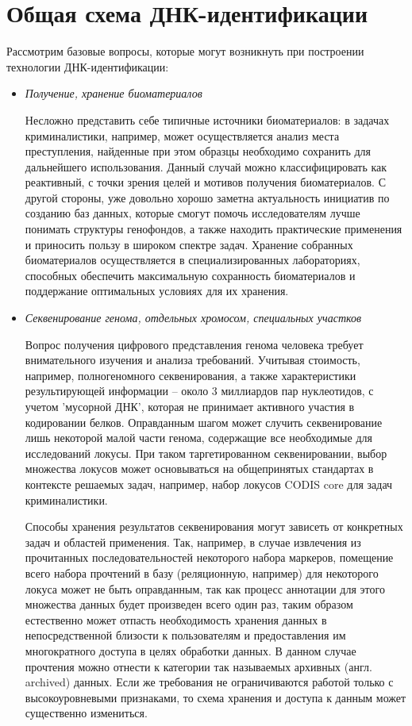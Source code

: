 \section{Общая схема ДНК-идентификации}

Рассмотрим базовые вопросы, которые могут возникнуть при построении технологии ДНК-идентификации:
\begin{itemize}

\item \textit{Получение, хранение биоматериалов}

Несложно представить себе типичные источники биоматериалов: в задачах криминалистики, например,
может осуществляется анализ места преступления, найденные при этом образцы необходимо сохранить
для дальнейшего использования. Данный случай можно классифицировать как реактивный, с точки зрения
целей и мотивов получения биоматериалов. С другой стороны, уже довольно хорошо заметна актуальность инициатив
по созданию баз данных, которые смогут помочь исследователям лучше понимать структуры генофондов,
а также находить практические применения и приносить пользу в широком спектре задач.
Хранение собранных биоматериалов осуществляется в специализированных лабораториях,
способных обеспечить максимальную сохранность биоматериалов и поддержание оптимальных условиях для
их хранения.

\item \textit{Секвенирование генома, отдельных хромосом, специальных участков}

Вопрос получения цифрового представления генома человека требует внимательного изучения и анализа
требований. Учитывая стоимость, например, полногеномного секвенирования, а также характеристики результирующей
информации -- около 3 миллиардов пар нуклеотидов, с учетом 'мусорной ДНК',
которая не принимает активного участия в кодировании белков.
Оправданным шагом может случить секвенирование лишь некоторой малой части генома,
содержащие все необходимые для исследований локусы. При таком таргетированном секвенировании, выбор
множества локусов может основываться на общепринятых стандартах в контексте решаемых задач,
например, набор локусов CODIS core для задач криминалистики.

Способы хранения результатов секвенирования могут зависеть от конкретных задач и областей применения.
Так, например, в случае извлечения из прочитанных последовательностей некоторого набора маркеров,
помещение всего набора прочтений в базу (реляционную, например) для некоторого локуса
может не быть оправданным, так как процесс аннотации для этого множества данных будет произведен
всего один раз, таким образом естественно может отпасть необходимость хранения данных
в непосредственной близости к пользователям и предоставления им многократного доступа в целях обработки данных.
В данном случае прочтения можно отнести к категории так называемых архивных (англ. archived) данных.
Если же требования не ограничиваются работой только с высокоуровневыми признаками,
то схема хранения и доступа к данным может существенно измениться.


\end{itemize}

